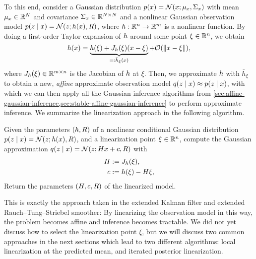 \documentclass{mimosis}
\begin{document}
To this end, consider a Gaussian distribution
\(\p(\st) = \N( \st; \mean{\st}, \cov{\st} )\)
with mean \(\mu_{x} \in \mathbb{R}^N\) and covariance \(\Sigma_{x} \in \mathbb{R}^{N \times N}\)
and a nonlinear Gaussian observation model
\(\p(\obs \mid \st) = \N( \obs; \obsh(\st), R )\),
where \(h: \mathbb{R}^n \to \mathbb{R}^m\) is a nonlinear function.
By doing a first-order Taylor expansion of \(h\) around some point \(\xi \in \mathbb{R}^n\), we obtain
\begin{equation}
  \obsh(\st) = \underbrace{\obsh(\xi) + \jac{\obsh}(\xi) (\st - \xi)}_{=: \bar{\obsh}_\xi(\st)} + \order{\| \st - \xi \|},
\end{equation}
where \(J_{h}(\xi) \in \mathbb{R}^{m \times n}\) is the Jacobian of \(h\) at \(\xi\).
Then, we approximate \(h\) with \(\bar{h}_\xi\) to obtain a new, \emph{affine} approximate observation model
\(\q(\obs \mid \st) \approx \p(\obs \mid \st)\),
with which we can then apply all the Gaussian inference algorithms from
\cref{sec:affine-gaussian-inference,sec:stable-affine-gaussian-inference}
to perform approximate inference.
We summarize the linearization approach in the following algorithm.

\begin{alg}
\algeqspacing
\label{alg:linearize}
Given the parameters \((h, R)\) of a nonlinear conditional Gaussian distribution
\(\p(\obs \mid \st) = \N( \obs; \obsh(\st), \obsC )\),
and a linearization point \(\xi \in \mathbb{R}^n\),
compute the Gaussian approximation
\(\q(\obs \mid \st) = \N( \obs; \obsA \st + \obsb, \obsC )\)
with
\begin{subequations}
\begin{align}
  H &:= J_{h}(\xi), \\
  c &:= h(\xi) - H \xi,
\end{align}
\end{subequations}
Return the parameters
\((H, c, R)\)
of the linearized model.
\end{alg}

This is exactly the approach taken in the extended Kalman filter and extended Rauch--Tung--Striebel smoother: By linearizing the observation model in this way, the problem becomes affine and inference becomes tractable.
We did not yet discuss how to select the linearization point \(\xi\),
but we will discuss two common approaches in the next sections which lead to two different algorithms:
local linearization at the predicted mean, and
iterated posterior linearization.
\end{document}
